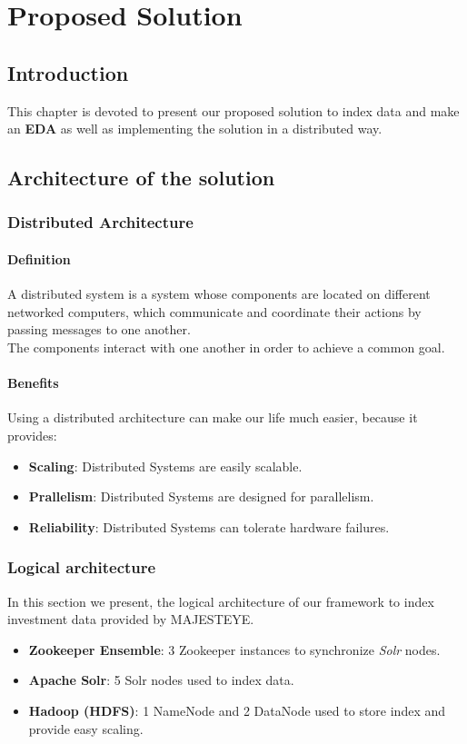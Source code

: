 \chapter{Proposed Solution}
\section{Introduction}
This chapter is devoted to present our proposed solution to index data and make an \textbf{EDA} as well as 
implementing the solution in a distributed way.

\section{Architecture of the solution}
\subsection{Distributed Architecture}
\subsubsection{Definition}
A distributed system is a system whose components are located on different networked computers, which communicate and coordinate their actions by passing messages to one another.\\ 
The components interact with one another in order to achieve a common goal.
 
\subsubsection{Benefits}
Using a distributed architecture can make our life much easier, because it provides: \\
\begin{itemize}
    \item \textbf{Scaling}: Distributed Systems are easily scalable.
    \item \textbf{Prallelism}: Distributed Systems are designed for parallelism.
    \item \textbf{Reliability}: Distributed Systems can tolerate hardware failures.
\end{itemize}
\cleardoublepage
\subsection{Logical architecture}
In this section we present, the logical architecture of our framework to index investment data provided by MAJESTEYE.
\begin{itemize}
    \item \textbf{Zookeeper Ensemble}: 3 Zookeeper instances to synchronize \textit{Solr} nodes.
    \item \textbf{Apache Solr}: 5 Solr nodes used to index data.
    \item \textbf{Hadoop (HDFS)}: 1 NameNode and 2 DataNode used to store index and provide easy scaling.
\end{itemize}

